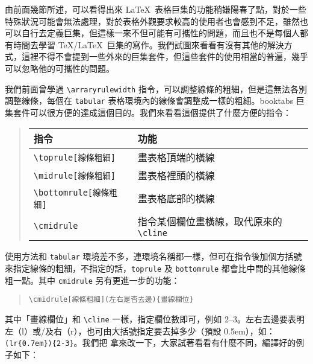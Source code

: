 由前面幾節所述，可以看得出來 \LaTeX\ 表格巨集的功能稍嫌陽春了點，對於一些特殊狀況可能會無法處理，對於表格外觀要求較高的使用者也會感到不足，雖然也可以自行去定義巨集，但這樣一來不但可能有可攜性的問題，而且也不是每個人都有時間去學習 \TeX/\LaTeX\ 巨集的寫作。我們試圖來看看有沒有其他的解決方式，這裡不得不會提到一些外來的巨集套件，但這些套件的使用相當的普遍，幾乎可以忽略他的可攜性的問題。

我們前面曾學過 \verb|\arraryrulewidth| 指令，可以調整線條的粗細，但是這無法各別調整線條，每個在 \texttt{tabular} 表格環境內的線條會調整成一樣的粗細。\textsf{booktabs} 巨集套件可以很方便的達成這個目的。我們來看看這個提供了什麼方便的指令：

\begin{quote}
  \begin{tabular}{ll}
    指令                    & 功能                                                   \\
    \hline
    \verb|\toprule[線條粗細]| & 畫表格頂端的橫線                                       \\
    \verb|\midrule[線條粗細]| & 畫表格裡頭的橫線                                       \\
    \verb|\bottomrule[線條粗細]| & 畫表格底部的橫線                                       \\
    \verb|\cmidrule| & 指令某個欄位畫橫線，取代原來的 \verb|\cline|
  \end{tabular}
\end{quote}

使用方法和 \texttt{tabular} 環境差不多，連環境名稱都一樣，但可在指令後加個方括號來指定線條的粗細，不指定的話，\texttt{toprule} 及 \texttt{bottomrule} 都會比中間的其他線條粗一點。其中 \texttt{cmidrule} 另有更進一步的功能：

\begin{quote}
  \begin{verbatim}
\cmidrule[線條粗細](左右是否去邊){畫線欄位}
\end{verbatim}
\end{quote}

其中「畫線欄位」和 \verb|\cline| 一樣，指定欄位數即可，例如 2--3。左右去邊要表明左（{\ttfamily l}）或/及右（{\ttfamily r}），也可由大括號指定要去掉多少（預設 0.5em），如：\verb|(lr{0.7em}){2-3}|。我們把
拿來改一下，大家試著看看有什麼不同，編譯好的例子如下：

